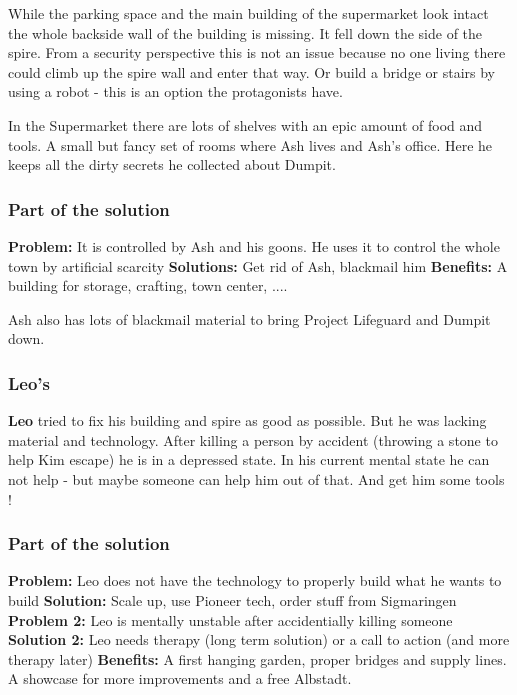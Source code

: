While the parking space and the main building of the supermarket look intact the whole backside wall of the building is missing. It fell down the side of the spire. From a security perspective this is not an issue because no one living there could climb up the spire wall and enter that way. Or build a bridge or stairs by using a robot - this is an option the protagonists have.

In the Supermarket there are lots of shelves with an epic amount of food and tools. A small but fancy set of rooms where Ash lives and Ash's office. Here he keeps all the dirty secrets he collected about Dumpit.

\subsubsection{Part of the solution}

\textbf{Problem:} It is controlled by Ash and his goons. He uses it to control the whole town by artificial scarcity
\textbf{Solutions:} Get rid of Ash, blackmail him
\textbf{Benefits:} A building for storage, crafting, town center, ....

Ash also has lots of blackmail material to bring Project Lifeguard and Dumpit down.

\subsubsection{Leo's}

\textbf{Leo} tried to fix his building and spire as good as possible. But he was lacking material and technology. After killing a person by accident (throwing a stone to help Kim escape) he is in a depressed state. In his current mental state he can not help - but maybe someone can help him out of that. And get him some tools !

\subsubsection{Part of the solution}

\textbf{Problem:} Leo does not have the technology to properly build what he wants to build
\textbf{Solution:} Scale up, use Pioneer tech, order stuff from Sigmaringen
\textbf{Problem 2:} Leo is mentally unstable after accidentially killing someone
\textbf{Solution 2:} Leo needs therapy (long term solution) or a call to action (and more therapy later)
\textbf{Benefits:} A first hanging garden, proper bridges and supply lines. A showcase for more improvements and a free Albstadt.

